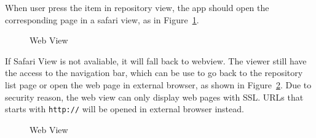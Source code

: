 \documentclass[12pt]{article}
\newcommand{\imgh}[4]{
    \begin{figure}[!htbp]%
    \begin{center}
    \subfloat{{\texttt{[image: \#2]} }}%
    \qquad
    \subfloat{{\texttt{[image: \#3]} }}%
    \caption{#4}\label{#2}
    \end{center}
\end{figure}
}
\begin{document}
When user press the item in repository view, the app should open the corresponding page in a safari view, as in Figure~\ref{safariview}.

\imgh{0.45}{safariview}{safariview_iphoneX}{Web View}

If Safari View is not avaliable, it will fall back to webview. The viewer still have the access to the navigation bar, which can be use to go back to the repository list page or open the web page in external browser, as shown in Figure~\ref{webview}. Due to security reason, the web view can only display web pages with SSL. URLs that starts with \texttt{http://} will be opened in external browser instead.

\imgh{0.45}{webview}{webview_iphoneX}{Web View}
\end{document}
